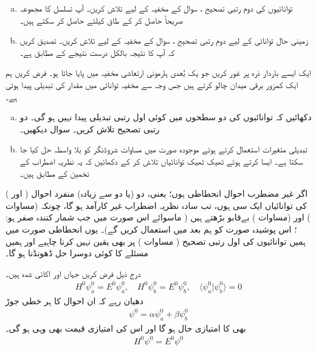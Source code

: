 \begin{enumerate}[a.]
\item
توانائیوں کی دوم رتبی تصحیح ، سوال  کے مخفیہ کے لیے تلاش کریں۔  آپ تسلسل کا مجموعہ صریحاً حاصل کر کے طاق  کیلئے  حاصل کر سکتے ہیں۔
\item
زمینی حال توانائی کے لیے دوم رتبی تصحیح ، سوال  کے مخفیہ کے لیے تلاش کریں۔ تصدیق کریں کہ آپ کا نتیجہ بالکل درست نتیجے کے مطابق ہے۔ 
\end{enumerate}
ایک ایسے باردار ذرہ پر غور کریں جو یک بُعدی ہارمونی ارتعاشی مخفیہ میں پایا جاتا ہو۔ فرض کریں ہم ایک کمزور برقی میدان  چالو کرتے ہیں جس وجہ سے مخفیہ توانائی میں  مقدار کی تبدیلی پیدا ہوتی ہے۔
\begin{enumerate}[a.]
\item
دکھائیں کہ توانائیوں کی دو سطحوں میں کوئی اول رتبی تبدیلی پیدا نہیں ہو گی۔ دو رتبی تصحیح تلاش کریں۔ سوال  دیکھیں۔
\item
تبدیلی متغیرات  استعمال کرتے ہوئے موجودہ صورت میں مساوات شروڈنگر کو بلا واسطہ حل کیا جا سکتا ہے۔ ایسا کرتے ہوئے ٹھیک ٹھیک توانائیاں تلاش کر کے دکھائیں کہ یہ نظریہ اضطراب کے تخمین کے مطابق ہیں۔
\end{enumerate}




اگر غیر مضطرب احوال انحطاطی ہوں؛ یعنی، دو (یا دو سے زیادہ) منفرد احوال (  اور ) کی توانائیاں ایک سی  ہوں، تب سادہ نظریہ اضطراب غیر کارآمد ہو گا، چونکہ  (مساوات ) اور  (مساوات ) بےقابو بڑھتے ہیں ( ماسوائے اس صورت میں جب شمار کنندہ صفر ہو: ؛ اس پوشیدہ صورت کو ہم بعد میں استعمال کریں گے)۔ یوں انحطاطی صورت میں ہمیں توانائیوں کی اول رتبی تصحیح ( مساوات ) پر بھی یقین نہیں کرنا چاہیے اور ہمیں مسئلے کا کوئی دوسرا حل ڈھونڈنا ہو گا۔


درج ذیل فرض کریں جہاں  اور  اکائی شدہ ہیں۔
\begin{align}\label{مساوات_غیر_مضطرب_دو_پڑتا_اضطراب}
H^0 \psi_a^0 = E^0 \psi_a^0, \quad H^0 \psi_b^0 = E^0 \psi_b^0, \quad \langle \psi_a^0 | \psi_b^0 \rangle = 0
\end{align}
دھیان رہے کہ ان احوال کا ہر خطی جوڑ 
\begin{align}\label{مساوات_غیر_مضطرب_دو_پڑتا_عمومی}
\psi^0 = \alpha \psi_a^0 + \beta \psi_b^0
\end{align}
بھی  کا امتیازی حال ہو گا اور اس کی امتیازی قیمت  بھی وہی ہو گی۔ 
\begin{align}\label{مساوات_غیر_مضطرب_دو_پڑتا_وہی_توانائی}
H^0 \psi^0 = E^0 \psi^0
\end{align}

